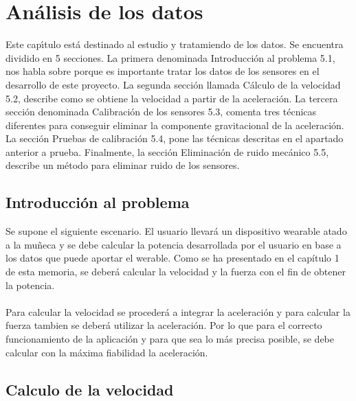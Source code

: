 \chapter{Análisis de los datos}

Este capı́tulo está destinado al estudio y tratamiendo de los datos. Se encuentra dividido en 5 secciones. La primera denominada Introducción al problema 5.1, nos habla sobre porque es importante tratar los datos de los sensores en el desarrollo de este proyecto. La segunda sección llamada Cálculo de la velocidad 5.2, describe como se obtiene la velocidad a partir de la aceleración. La tercera sección denominada Calibración de los sensores 5.3, comenta tres técnicas diferentes para conseguir eliminar la componente gravitacional de la aceleración. La sección Pruebas de calibración 5.4, pone las técnicas descritas en el apartado anterior a prueba. Finalmente, la sección Eliminación de ruido mecánico 5.5, describe un método para eliminar ruido de los sensores.

\section{Introducción al problema}

Se supone el siguiente escenario. El usuario llevará un dispositivo wearable atado a la muñeca y se debe calcular la potencia desarrollada por el usuario en base a los datos que puede aportar el werable. Como se ha presentado en el capítulo 1 de esta memoria, se deberá calcular la velocidad y la fuerza con el fin de obtener la potencia.
\\
\\
Para calcular la velocidad se procederá a integrar la aceleración y para calcular la fuerza tambien se deberá utilizar la aceleración. Por lo que para el correcto funcionamiento de la aplicación y para que sea lo más precisa posible, se debe calcular con la máxima fiabilidad la aceleración.

\section{Calculo de la velocidad}

